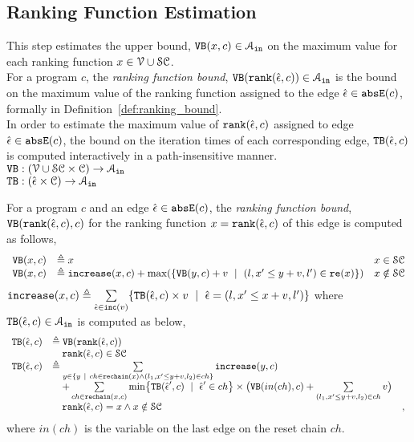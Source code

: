   \subsection{Ranking Function Estimation}
  This step estimates the upper bound, ${\mathtt{VB}}(x, c) \in \mathcal{A}_{\mathtt{in}}$
  on the maximum value for each ranking function   $x \in  \mathcal{V} \cup \mathcal{SC}$.
  \\
  For a program $c$, the \emph{ranking function bound},
  ${\mathtt{VB}}(\mathtt{rank}(\hat{\mathtt{\epsilon}{}}, c)) \in \mathcal{A}_{\mathtt{in}}$ is 
  the bound on the maximum value of the ranking function  
  assigned to the edge $\hat{\mathtt{\epsilon}{}} \in \mathtt{abs}{\mathtt{E}}(c)$, formally in Definition~\ref{def:ranking_bound}.
  \\
  In order to estimate the maximum value of $\mathtt{rank}(\hat{\mathtt{\epsilon}{}}, c)$ assigned to edge $\hat{\mathtt{\epsilon}{}} \in \mathtt{abs}{\mathtt{E}}(c)$,
  the bound on the iteration times of each corresponding edge, ${\mathtt{TB}}(\hat{\mathtt{\epsilon}{}}, c)$ 
  is computed interactively in a path-insensitive manner.
  \\ 
  $ {\mathtt{VB}}: (\mathcal{V} \cup \mathcal{SC}  \times \mathcal{C}) \to \mathcal{A}_{\mathtt{in}}$
  \\
  ${\mathtt{TB}}: (\hat{\mathtt{\epsilon}{}} \times \mathcal{C}) \to \mathcal{A}_{\mathtt{in}}$
  \begin{defn}
    \label{def:ranking_bound}
  For a program $c$ and an edge $\hat{\mathtt{\epsilon}{}} \in \mathtt{abs}{\mathtt{E}}(c)$,
  the \emph{ranking function bound}, 
  ${\mathtt{VB}}(\mathtt{rank}(\hat{\mathtt{\epsilon}{}}, c), c)$ for the ranking function $x = \mathtt{rank}(\hat{\mathtt{\epsilon}{}}, c)$
  of this edge
  is computed as follows,
    \[ 
  \begin{array}{lll}
    {\ensuremath{\mathtt{VB}}}(x, c) & \triangleq x & x \in \mathcal{SC} \\
    {\mathtt{VB}}(x, c) & \triangleq \mathtt{increase}(x, c) + \max(\{{\mathtt{VB}}(y, c) + v ~\mid~ (l, x' \leq y + v, l') \in \mathtt{re}(x)\}) & x \notin \mathcal{SC}
  \end{array}
  \]
  $\mathtt{increase}(x, c) \triangleq \sum\limits_{\hat{\mathtt{\epsilon}{}} \in \mathtt{inc}(v)}\{{\mathtt{TB}}(\hat{\mathtt{\epsilon}{}}, c) \times v ~\mid~ \hat{\mathtt{\epsilon}{}} = (l, x' \leq x + v, l')\}$ where 
  ${\mathtt{TB}}(\hat{\mathtt{\epsilon}{}}, c) \in \mathcal{A}_{\mathtt{in}}$  is computed as below,
\[ 
\begin{array}{lll}
  \absclr(\absevent, c) 
  & \triangleq \varinvar(\locbound(\absevent, c))  & \\
  & \quad \locbound(\absevent, c) \in \constdom & \\
  \absclr(\absevent, c) 
  & \triangleq
    \sum\limits_{y \in \{ y ~|~ 
    ch \in \resetchain(x) \land (l_1, x' \leq y + v, l_2) \in ch \} } \incrs(y, c) & \\
    & \quad + 
  \sum\limits_{ch \in \resetchain(x, c)}
  \min \left\{\absclr(\absevent', c) ~\mid~ \absevent' \in ch\right\} \times 
  \big(\varinvar(in(ch), c) 
  + \sum\limits_{(l_1, x' \leq y + v, l_2) \in ch} v \big) & \\
  &  \quad \locbound(\absevent, c) = x \land x \notin \constdom & ,
\end{array}
  \]
 where $in(ch)$ is the variable on the last edge on the reset chain $ch$.
\end{defn}
